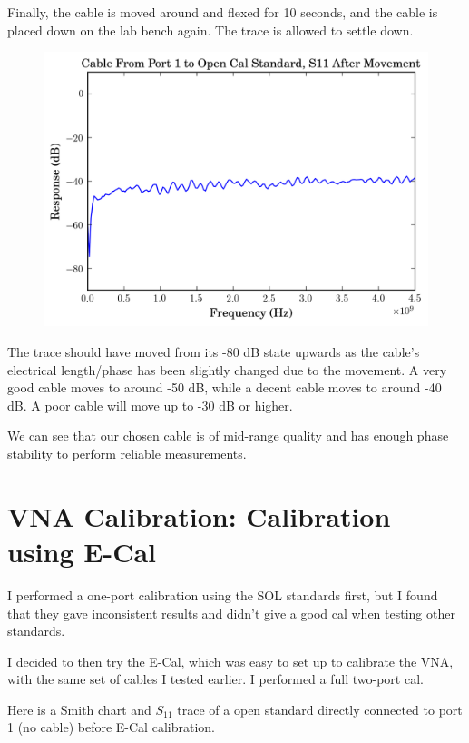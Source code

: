 \documentclass[11pt]{article}
\begin{document}
Finally, the cable is moved around and flexed for 10 seconds, and the cable is placed down on the lab bench again. The trace is allowed to settle down.

\begin{figure}[H]
	\centering \includegraphics[width=\linewidth-6cm]{images/one_port_s11_open_cal_after_movement.png}
\end{figure}

The trace should have moved from its -80 dB state upwards as the cable's electrical length/phase has been slightly changed due to the movement. A very good cable moves to around -50 dB, while a decent cable moves to around -40 dB. A poor cable will move up to -30 dB or higher.

We can see that our chosen cable is of mid-range quality and has enough phase stability to perform reliable measurements.

\section{VNA Calibration: Calibration using E-Cal}

I performed a one-port calibration using the SOL standards first, but I found that they gave inconsistent results and didn't give a good cal when testing other standards.

I decided to then try the E-Cal, which was easy to set up to calibrate the VNA, with the same set of cables I tested earlier. I performed a full two-port cal.

Here is a Smith chart and $S_{11}$ trace of a open standard directly connected to port 1 (no cable) before E-Cal calibration.
\end{document}

